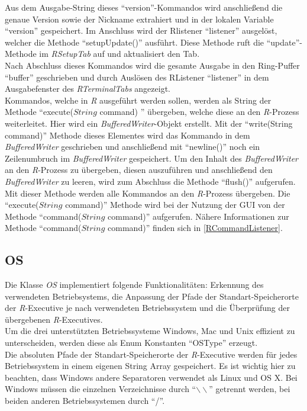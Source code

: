 \documentclass[a4paper, 12pt]{report} %
\begin{document}
Aus dem Ausgabe-String dieses "`version"'-Kommandos wird anschließend die genaue Version sowie der Nickname extrahiert und in der lokalen Variable "`version"' gespeichert. Im Anschluss wird der Rlistener  "`listener"' ausgelöst, welcher die Methode "`setupUpdate()"' ausführt. Diese Methode ruft die "`update"'-Methode im \textit{RSetupTab} auf und aktualisiert den Tab.\\

Nach Abschluss dieses Kommandos wird die gesamte Ausgabe in den Ring-Puffer "`buffer"' geschrieben und durch Auslösen des RListener "`listener"' in dem Ausgabefenster des \textit{RTerminalTabs} angezeigt.\\

Kommandos, welche in \textit{R} ausgeführt werden sollen, werden als String der Methode "`execute($String$ command) "' übergeben, welche diese an den \textit{R}-Prozess weiterleitet. Hier wird ein \textit{BufferedWriter}-Objekt erstellt. Mit der "`write(String command)"' Methode dieses Elementes wird das Kommando in dem \textit{BufferedWriter} geschrieben und anschließend mit "`newline()"' noch ein Zeilenumbruch im \textit{BufferedWriter} gespeichert. Um den Inhalt des \textit{BufferedWriter} an den \textit{R}-Prozess zu übergeben, diesen auszuführen und anschließend den \textit{BufferedWriter} zu leeren, wird zum Abschluss die Methode "`flush()"' aufgerufen.
Mit dieser Methode werden alle Kommandos an den \textit{R}-Prozess übergeben. Die "`execute($String$ command)"' Methode wird bei der Nutzung der GUI von der Methode "`command($String$ command)"' aufgerufen. Nähere Informationen zur Methode "`command($String$ command)"' finden sich in \ref{RCommandListener}.

\subsection{OS} \label{OS}

Die Klasse \textit{OS} implementiert folgende Funktionalitäten: Erkennung des verwendeten Betriebsystems, die Anpassung der Pfade der Standart-Speicherorte der \textit{R}-Executive je nach verwendeten Betriebssystem und die Überprüfung der übergebenen \textit{R}-Executives.\\

Um die drei unterstützten Betriebssysteme Windows, Mac und Unix effizient zu unterscheiden, werden diese als Enum Konstanten "`OSType"' erzeugt.\\

Die absoluten Pfade der Standart-Speicherorte der \textit{R}-Executive werden für jedes Betriebssystem in einem eigenen String Array gespeichert. Es ist wichtig hier zu beachten, dass Windows andere Separatoren verwendet als Linux und OS X.
Bei Windows müssen die einzelnen Verzeichnisse durch "`$\backslash \backslash$"' getrennt werden, bei beiden anderen Betriebssystemen durch "`/"'. 
\end{document}
